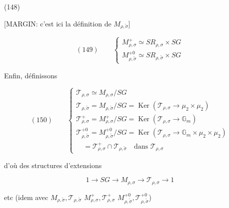 \begin{enumerate}
\newpage



\newpage


(148)
[MARGIN: c'est ici la définition de $M_{\rho,\mathring{\sigma}}$]

$$
(149) \qquad
\begin{cases}
M_{\rho,\sigma}^+ \simeq S R_{\rho,\sigma} \times S G \\
M_{\rho,\mathring{\sigma}}^{+0} \simeq S R_{\rho,\mathring{\sigma}} \times S G
\end{cases}
$$

Enfin, définissons

$$
(150) \qquad
\begin{cases}
\mathcal{T}_{\rho,\sigma} \simeq M_{\rho,\sigma} / S G \\
\mathcal{T}_{\rho,\mathring{\sigma}} = M_{\rho,\mathring{\sigma}} / S G = \operatorname{Ker}(\mathcal{T}_{\rho,\sigma} \to \mu_2 \times \mu_2) \\
\mathcal{T}_{\rho,\sigma}^+ = M_{\rho,\sigma}^+ / S G = \operatorname{Ker}(\mathcal{T}_{\rho,\sigma} \to \mathbb{G}_m) \\
\mathcal{T}_{\rho,\mathring{\sigma}}^{+0} = M_{\rho,\mathring{\sigma}}^{+0} / S G = \operatorname{Ker}(\mathcal{T}_{\rho,\sigma} \to \mathbb{G}_m \times \mu_2 \times \mu_2) \\
\quad = \mathcal{T}_{\rho,\sigma}^+ \cap \mathcal{T}_{\rho,\mathring{\sigma}} \quad \text{dans } \mathcal{T}_{\rho,\sigma}
\end{cases}
$$

d'où des structures d'extensions

$$ 1 \to S G \to M_{\rho,\sigma} \to \mathcal{T}_{\rho,\sigma} \to 1 $$

etc (idem avec 
$M_{\rho,\mathring{\sigma}}, \mathcal{T}_{\rho,\mathring{\sigma}}$
$M_{\rho,\sigma}^+, \mathcal{T}_{\rho,\sigma}^+$
$M_{\rho,\mathring{\sigma}}^{+0}, \mathcal{T}_{\rho,\mathring{\sigma}}^{+0}$)


\end{enumerate}
